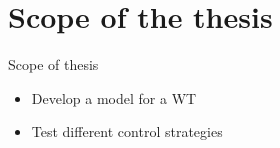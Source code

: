 
\section{Scope of the thesis}
\begin{frame}{Scope of thesis}
  \begin{itemize}
    \item Develop a model for a WT
    \item Test different control strategies
  \end{itemize}
\end{frame}

                                                    
